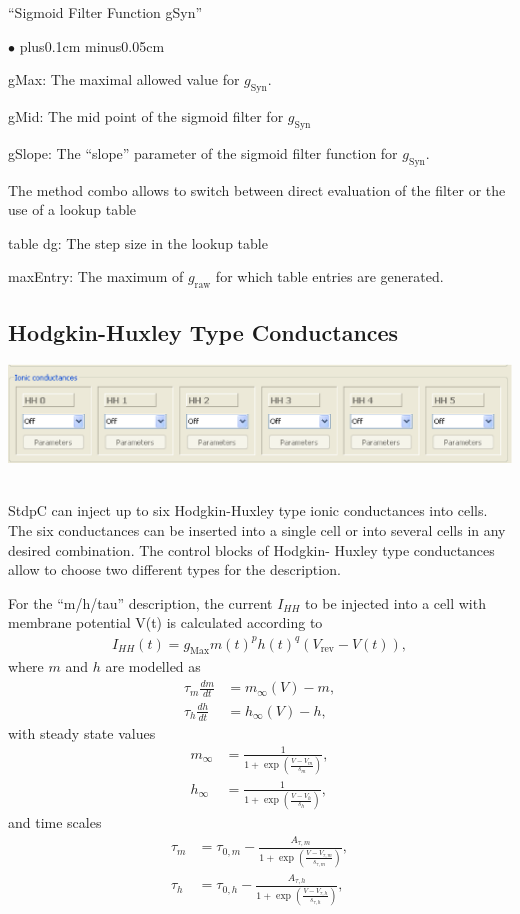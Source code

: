 \documentclass{article}
\newenvironment{myitem}{\begin{list}{$\bullet$}{\setlength{\leftmargin}{1.1em}
\itemsep0.1cm plus0.1cm minus0.05cm
\listparindent0cm
\addtolength{\labelsep}{0.5\labelsep}
\setlength{\labelwidth}{0.8em}
\setlength{\leftmargin}{\labelwidth}
\addtolength{\leftmargin}{\labelsep}
}}{\end{list}}
\begin{document}
``Sigmoid Filter Function gSyn''
\begin{myitem}
\item gMax: The maximal allowed value for $g_{\text{Syn}}$.
\item gMid: The mid point of the sigmoid filter for $g_{\text{Syn}}$
\item gSlope: The ``slope'' parameter of the sigmoid filter function
  for $g_{\text{Syn}}$.
\item The method combo allows to switch between direct evaluation of
  the filter or the use of a lookup table
\item table dg: The step size in the lookup table
\item maxEntry: The maximum of $g_{\text{raw}}$ for which table
  entries are generated.
\end{myitem}  
\subsection{Hodgkin-Huxley Type Conductances}

\parbox{\textwidth}{
  \includegraphics[scale=0.5]{HHBlock}
} \\[0.2cm]
 
StdpC can inject up to six Hodgkin-Huxley type ionic conductances into
cells. The six conductances can be inserted into a single cell
or into several cells in any desired combination. The control blocks
of Hodgkin- Huxley type conductances allow to choose two different
types for the description.

For the ``m/h/tau'' description, the current $I_{HH}$ to be injected
into a cell with membrane potential V(t) is calculated according to
\begin{align}
  I_{HH}(t) = g_{\text{Max}} m(t)^p h(t)^q (V_{\text{rev}}-V(t)),
\end{align}
where $m$ and $h$ are modelled as
\begin{align}
  \tau_m \frac{dm}{dt} &= m_\infty(V)-m , \\
  \tau_h \frac{dh}{dt} &= h_\infty(V)- h, 
\end{align}
with steady state values
\begin{align}
  m_\infty &= \frac{1}{1+\exp \left(\frac{V - V_m}{s_m}
  \right)}, \\
  h_\infty &= \frac{1}{1+\exp \left(\frac{V - V_h}{s_h}
  \right)}, 
\end{align}
and time scales 
\begin{align}
  \tau_m &= \tau_{0,m} - 
  \frac{A_{\tau,m}}{1+\exp\left(\frac{V-V_{\tau,m}}{s_{\tau,m}}\right)}, \\
  \tau_h &= \tau_{0,h} - 
  \frac{A_{\tau,h}}{1+\exp\left(\frac{V-V_{\tau,h}}{s_{\tau,h}}\right)}, 
\end{align}
  
\end{document}

